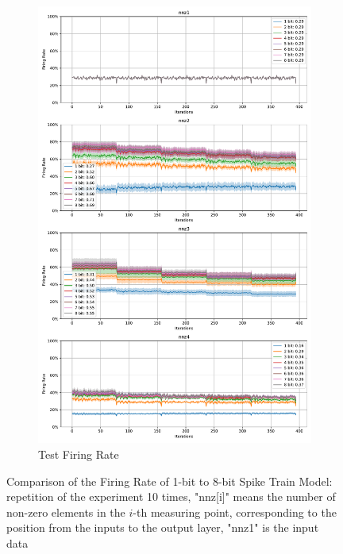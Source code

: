         \begin{figure}[!htpb]
            \ContinuedFloat
            \begin{subfigure}[H]{0.9\textwidth}
                \centering
                \includegraphics[width=\textwidth]{../standard/FashionMNIST/plots/fashionmnist_test_firerate.pdf}
                \caption{Test Firing Rate}
            \end{subfigure}
            \caption{Comparison of the Firing Rate of 1-bit to 8-bit Spike Train Model: repetition of the experiment 10 times, "nnz[i]" means the number of non-zero elements in the $i$-th measuring point, corresponding to the position from the inputs to the output layer, "nnz1" is the input data}
            \label{fig:firing_rate}
        \end{figure}

